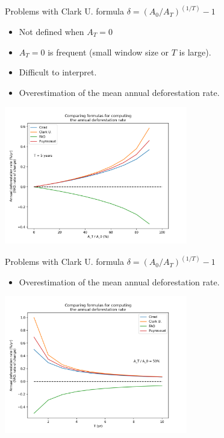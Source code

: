 \documentclass[10pt,table,dvipsnames,compress]{beamer}
\begin{document}
\begin{frame}[label={sec:org42ad2e7}]{Problems with Clark U. formula}
\centering \alert{\alert{\(\delta = (A_0/A_T)^{(1/T)}-1\)}}
\vspace{0.25cm}

\begin{itemize}
\item Not defined when \(A_T=0\)
\item \(A_T=0\) is frequent (small window size or \(T\) is large).
\item Difficult to interpret.
\item Overestimation of the mean annual deforestation rate.
\end{itemize}

\begin{center}
\includegraphics[width=0.6\textwidth]{figs/D-perc-relationship.png}
\end{center}
\end{frame}

\begin{frame}[label={sec:orgfb791a8}]{Problems with Clark U. formula}
\centering \alert{\alert{\(\delta = (A_0/A_T)^{(1/T)}-1\)}}
\vspace{0.25cm}

\begin{itemize}
\item Overestimation of the mean annual deforestation rate.
\end{itemize}

\begin{center}
\includegraphics[width=0.6\textwidth]{figs/D-T-relationship.png}
\end{center}
\end{frame}
\end{document}
